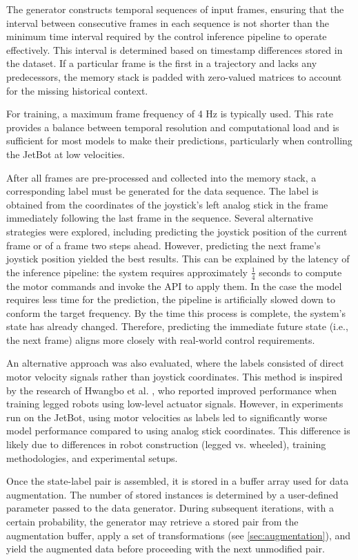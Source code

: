 The generator constructs temporal sequences of input frames, ensuring that the interval between consecutive frames in each sequence is not shorter than the minimum time interval required by the control inference pipeline to operate effectively. This interval is determined based on timestamp differences stored in the dataset. If a particular frame is the first in a trajectory and lacks any predecessors, the memory stack is padded with zero-valued matrices to account for the missing historical context.

For training, a maximum frame frequency of 4 Hz is typically used. This rate provides a balance between temporal resolution and computational load and is sufficient for most models to make their predictions, particularly when controlling the JetBot at low velocities.

After all frames are pre-processed and collected into the memory stack, a corresponding label must be generated for the data sequence. The label is obtained from the coordinates of the joystick's left analog stick in the frame immediately following the last frame in the sequence. Several alternative strategies were explored, including predicting the joystick position of the current frame or of a frame two steps ahead. However, predicting the next frame's joystick position yielded the best results. This can be explained by the latency of the inference pipeline: the system requires approximately $\frac{1}{4}$ seconds to compute the motor commands and invoke the API to apply them. In the case the model requires less time for the prediction, the pipeline is artificially slowed down to conform the target frequency. By the time this process is complete, the system's state has already changed. Therefore, predicting the immediate future state (i.e., the next frame) aligns more closely with real-world control requirements.

An alternative approach was also evaluated, where the labels consisted of direct motor velocity signals rather than joystick coordinates. This method is inspired by the research of Hwangbo et al. \autocite{hwangbo2019learning}, who reported improved performance when training legged robots using low-level actuator signals. However, in experiments run on the JetBot, using motor velocities as labels led to significantly worse model performance compared to using analog stick coordinates. This difference is likely due to differences in robot construction (legged vs. wheeled), training methodologies, and experimental setups.

Once the state-label pair is assembled, it is stored in a buffer array used for data augmentation. The number of stored instances is determined by a user-defined parameter passed to the data generator. During subsequent iterations, with a certain probability, the generator may retrieve a stored pair from the augmentation buffer, apply a set of transformations (see \autoref{sec:augmentation}), and yield the augmented data before proceeding with the next unmodified pair.


